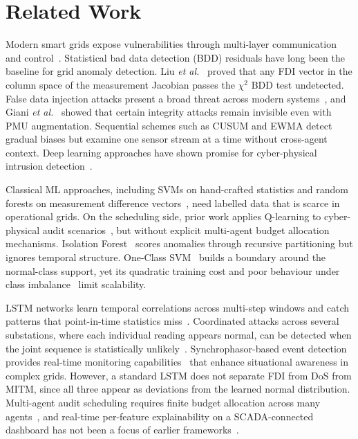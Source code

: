 \documentclass[conference,a4paper]{IEEEtran}
\begin{document}
\section{Related Work}

Modern smart grids expose vulnerabilities through multi-layer communication and control~\cite{b1}. Statistical bad data detection (BDD) residuals have long been the baseline for grid anomaly detection. Liu \textit{et al.}~\cite{b2} proved that any FDI vector in the column space of the measurement Jacobian passes the $\chi^2$ BDD test undetected. False data injection attacks present a broad threat across modern systems~\cite{b3}, and Giani \textit{et al.}~\cite{b4} showed that certain integrity attacks remain invisible even with PMU augmentation. Sequential schemes such as CUSUM and EWMA detect gradual biases but examine one sensor stream at a time without cross-agent context. Deep learning approaches have shown promise for cyber-physical intrusion detection~\cite{b5}.

Classical ML approaches, including SVMs on hand-crafted statistics and random forests on measurement difference vectors~\cite{b6}, need labelled data that is scarce in operational grids. On the scheduling side, prior work applies Q-learning to cyber-physical audit scenarios~\cite{b7}, but without explicit multi-agent budget allocation mechanisms. Isolation Forest~\cite{b8} scores anomalies through recursive partitioning but ignores temporal structure. One-Class SVM~\cite{b9} builds a boundary around the normal-class support, yet its quadratic training cost and poor behaviour under class imbalance~\cite{b10} limit scalability.

LSTM networks learn temporal correlations across multi-step windows and catch patterns that point-in-time statistics miss~\cite{b11}. Coordinated attacks across several substations, where each individual reading appears normal, can be detected when the joint sequence is statistically unlikely~\cite{b12}. Synchrophasor-based event detection provides real-time monitoring capabilities~\cite{b13} that enhance situational awareness in complex grids. However, a standard LSTM does not separate FDI from DoS from MITM, since all three appear as deviations from the learned normal distribution. Multi-agent audit scheduling requires finite budget allocation across many agents~\cite{b14}, and real-time per-feature explainability on a SCADA-connected dashboard has not been a focus of earlier frameworks~\cite{b15}.
\end{document}
